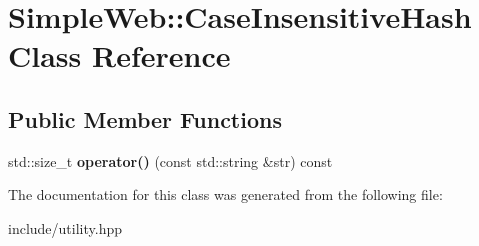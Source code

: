 \hypertarget{classSimpleWeb_1_1CaseInsensitiveHash}{}\section{Simple\+Web\+:\+:Case\+Insensitive\+Hash Class Reference}
\label{classSimpleWeb_1_1CaseInsensitiveHash}
\subsection*{Public Member Functions}
\begin{DoxyCompactItemize}
\item 
std\+::size\+\_\+t {\bfseries operator()} (const std\+::string \&str) const \hypertarget{classSimpleWeb_1_1CaseInsensitiveHash_a802dd980819913fa456631d9affe75bd}{}\label{classSimpleWeb_1_1CaseInsensitiveHash_a802dd980819913fa456631d9affe75bd}

\end{DoxyCompactItemize}


The documentation for this class was generated from the following file\+:\begin{DoxyCompactItemize}
\item 
include/utility.\+hpp\end{DoxyCompactItemize}
